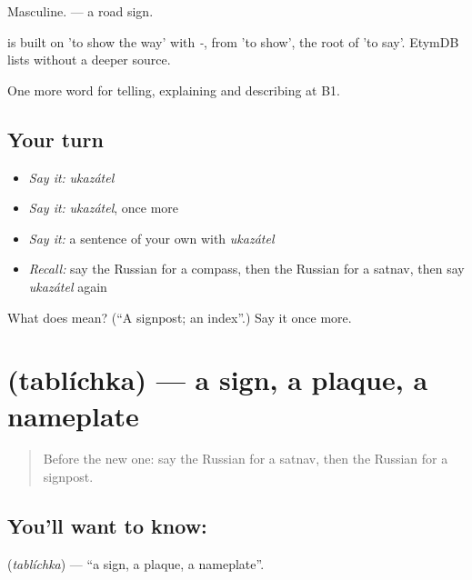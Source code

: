Masculine. \emph{ } — a road sign.

\begin{cousinweb}
\emph{} is built on \emph{} 'to show the way' with \emph{-}, from \emph{} 'to show', the root of \emph{} 'to say'. EtymDB lists \emph{} without a deeper source.
\end{cousinweb}

\begin{grammarlens}[title={What you've built}]
One more word for telling, explaining and describing at B1.
\end{grammarlens}

\subsection*{Your turn}
\begin{itemize}
\raggedright
  \item \emph{Say it:} \emph{ukazátel}
  \item \emph{Say it:} \emph{ukazátel}, once more
  \item \emph{Say it:} a sentence of your own with \emph{ukazátel}
  \item \emph{Recall:} say the Russian for a compass, then the Russian for a satnav, then say \emph{ukazátel} again
\end{itemize}

\begin{tcolorbox}[breakable,colback=teal!4,colframe=teal!35!black,title={Before you move on}]
What does  mean? (\textquotedblleft{}A signpost; an index\textquotedblright{}.) Say it once more.
\end{tcolorbox}
\section[\texorpdfstring{\ru{табличка} (tablíchka)}{табличка (tablíchka)}]{ (tablíchka) — a sign, a plaque, a nameplate}

\label{lesson:RU-C438-tablichka}



\begin{quote}
Before the new one: say the Russian for a satnav, then the Russian for a signpost.
\end{quote}

\subsection*{You'll want to know: }
\textbf{} (\emph{tablíchka}) — \textquotedblleft{}a sign, a plaque, a nameplate\textquotedblright{}.

